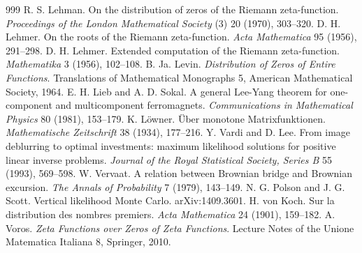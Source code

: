 \begin{thebibliography}{999}
 R. S. Lehman. On the distribution of zeros of the Riemann zeta-function. \emph{Proceedings of the London Mathematical Society} (3) 20 (1970), 303--320.
 D. H. Lehmer. On the roots of the Riemann zeta-function. \emph{Acta Mathematica} 95 (1956), 291--298.
 D. H. Lehmer. Extended computation of the Riemann zeta-function. \emph{Mathematika} 3 (1956), 102--108.
 B. Ja. Levin. \emph{Distribution of Zeros of Entire Functions}. Translations of Mathematical Monographs 5, American Mathematical Society, 1964.
 E. H. Lieb and A. D. Sokal. A general Lee-Yang theorem for one-component and multicomponent ferromagnets. \emph{Communications in Mathematical Physics} 80 (1981), 153--179.
 K. L\"owner. \"Uber monotone Matrixfunktionen. \emph{Mathematische Zeitschrift} 38 (1934), 177--216.
 Y. Vardi and D. Lee. From image deblurring to optimal investments: maximum likelihood solutions for positive linear inverse problems. \emph{Journal of the Royal Statistical Society, Series B} 55 (1993), 569--598.
 W. Vervaat. A relation between Brownian bridge and Brownian excursion. \emph{The Annals of Probability} 7 (1979), 143--149.
 N. G. Polson and J. G. Scott. Vertical likelihood Monte Carlo. arXiv:1409.3601.
 H. von Koch. Sur la distribution des nombres premiers. \emph{Acta Mathematica} 24 (1901), 159--182.
 A. Voros. \emph{Zeta Functions over Zeros of Zeta Functions}. Lecture Notes of the Unione Matematica Italiana 8, Springer, 2010.

\end{thebibliography}
